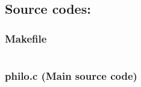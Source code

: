 \documentclass[a4paper,11pt]{article}
\begin{document}
\subsection*{Source codes:}

\subsubsection*{Makefile}
\inputminted[fontsize=\footnotesize,linenos]{basemake}{Makefile}

\subsubsection*{philo.c (Main source code)}
\inputminted[fontsize=\footnotesize,linenos]{c}{philo.c}
\end{document}
